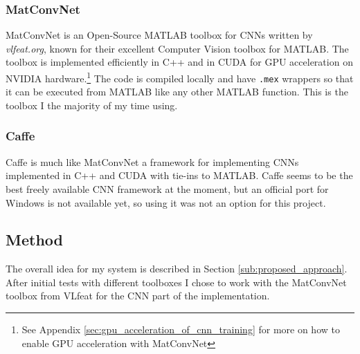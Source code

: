 \documentclass[Main]{subfiles}
\begin{document}
		\subsubsection{MatConvNet} %
			\label{ssub:matconvnet}
			MatConvNet \cite{Lenc2014} is an Open-Source MATLAB toolbox for CNNs written by \emph{vlfeat.org}, known for their excellent Computer Vision toolbox for MATLAB.
			The toolbox is implemented efficiently in C++ and in CUDA for GPU acceleration on NVIDIA hardware.\footnote{
				See Appendix \ref{sec:gpu_acceleration_of_cnn_training} for more on how to enable GPU acceleration with MatConvNet
				} 
			The code is compiled locally and have \texttt{.mex} wrappers so that it can be executed from MATLAB like any other MATLAB function.
			This is the toolbox I the majority of my time using.
		
		
		\subsubsection{Caffe} %
			\label{ssub:caffe}
			Caffe \cite{jia2014caffe} is much like MatConvNet a framework for implementing CNNs implemented in C++ and CUDA with tie-ins to MATLAB.
			Caffe seems to be the best freely available CNN framework at the moment, but an official port for Windows is not available yet, so using it was not an option for this project.



	\subsection{Method} %
		\label{sub:cnn_method}
		The overall idea for my system is described in Section \ref{sub:proposed_approach}.
		After initial tests with different toolboxes I chose to work with the MatConvNet toolbox from VLfeat for the CNN part of the implementation.
		
\end{document}
